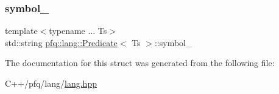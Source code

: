 \subsubsection{\texorpdfstring{symbol\+\_\+}{symbol\_}}
{\footnotesize\ttfamily template$<$typename ... Ts$>$ \\
std\+::string \hyperlink{structpfq_1_1lang_1_1Predicate}{pfq\+::lang\+::\+Predicate}$<$ Ts $>$\+::symbol\+\_\+}



The documentation for this struct was generated from the following file\+:\begin{DoxyCompactItemize}
\item 
C++/pfq/lang/\hyperlink{lang_8hpp}{lang.\+hpp}\end{DoxyCompactItemize}
